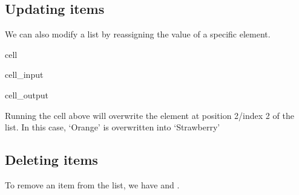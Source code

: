 \documentclass[letterpaper,10pt,english]{jupyterBook}
\begin{document}
\subsection{Updating items}
\label{\detokenize{datatypes:updating-items}}
\sphinxAtStartPar
We can also modify a list by reassigning the value of a specific element.

\begin{sphinxuseclass}{cell}\begin{sphinxVerbatimInput}

\begin{sphinxuseclass}{cell_input}
\begin{sphinxVerbatim}[commandchars=\\\{\}]
  \PYG{p}{[}  \PYG{p}{]}
\PYG{p}{[}\PYG{p}{]}  
\end{sphinxVerbatim}

\end{sphinxuseclass}\end{sphinxVerbatimInput}
\begin{sphinxVerbatimOutput}

\begin{sphinxuseclass}{cell_output}
\begin{sphinxVerbatim}
\end{sphinxVerbatim}

\end{sphinxuseclass}\end{sphinxVerbatimOutput}

\end{sphinxuseclass}
\sphinxAtStartPar
Running the cell above will overwrite the element at position 2/index 2 of the list. In this case, ‘Orange’ is overwritten into ‘Strawberry’


\subsection{Deleting items}
\label{\detokenize{datatypes:deleting-items}}
\sphinxAtStartPar
To remove an item from the list, we have  and .
\end{document}

